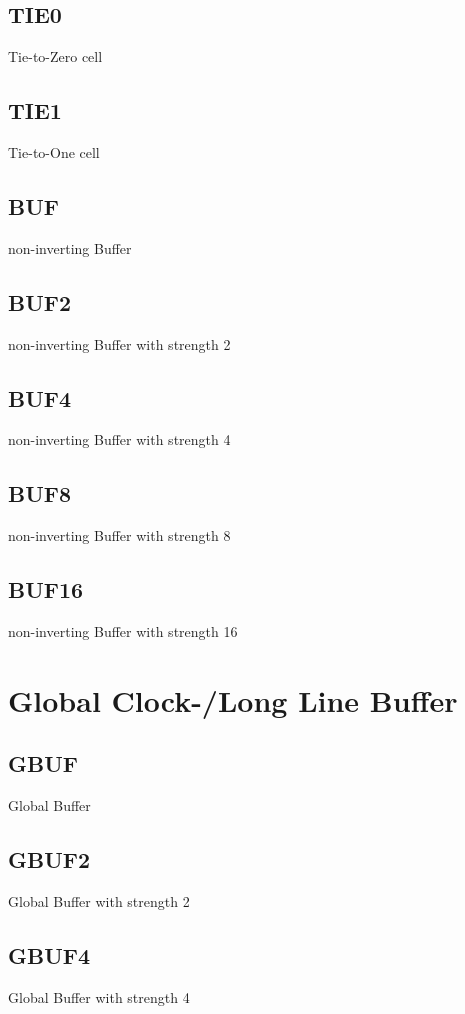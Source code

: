 \documentclass[12pt, a4paper, twoside, titlepage]{article}
\begin{document}
\subsection{TIE0}
Tie-to-Zero cell

\subsection{TIE1}
Tie-to-One cell

\subsection{BUF}
non-inverting Buffer

\subsection{BUF2}
non-inverting Buffer with strength 2

\subsection{BUF4}
non-inverting Buffer with strength 4

\subsection{BUF8}
non-inverting Buffer with strength 8

\subsection{BUF16}
non-inverting Buffer with strength 16


\section{Global Clock-/Long Line Buffer}

\subsection{GBUF}
Global Buffer

\subsection{GBUF2}
Global Buffer with strength 2

\subsection{GBUF4}
Global Buffer with strength 4
\end{document}
